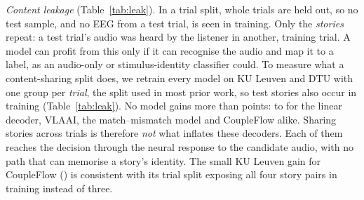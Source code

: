 \documentclass[10pt,twocolumn,letterpaper]{article}
\begin{document}
\emph{Content leakage} (Table~\ref{tab:leak}). In a trial split, whole trials are held
out, so no test sample, and no EEG from a test trial, is seen in training. Only the
\emph{stories} repeat: a test trial's audio was heard by the listener in another, training
trial. A model can profit from this only if it can recognise the audio and map it to a
label, as an audio-only or stimulus-identity classifier could. To measure what a content-sharing split does, we retrain every
model on KU Leuven and DTU with one group per \emph{trial}, the split used in most prior
work, so test stories also occur in training (Table~\ref{tab:leak}). No model gains
more than \leakMax{} points: \leakMin{} to \leakMax{} for the linear decoder, VLAAI, the match--mismatch
model and CoupleFlow alike. Sharing stories across trials is therefore \emph{not} what
inflates these decoders. Each of them reaches the decision through the neural response
to the candidate audio, with no path that can memorise a story's identity. The small KU Leuven gain for CoupleFlow (\leakMax) is consistent
with its trial split exposing all four story pairs in training instead of three.
\end{document}

